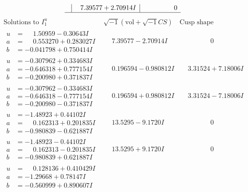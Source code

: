 \documentclass[1p]{elsarticle_modified}
\theoremstyle{definition}
\newcommand{\I}{\sqrt{-1}}
\begin{document}
$$\begin{array}{c|c|c}
 & \phantom{-}7.39577 + 2.70914 I & \phantom{-0.000000 } 0\\
 \hline 
 \end{array}$$\newpage$$\begin{array}{c|c|c}  
\text{Solutions to }I^u_{1}& \I (\text{vol} + \sqrt{-1}CS) & \text{Cusp shape}\\
 \hline 
\begin{aligned}
u &= \phantom{-}1.50959 - 0.30643 I \\
a &= \phantom{-}0.553270 + 0.283027 I \\
b &= -0.041798 + 0.750414 I\end{aligned}
 & \phantom{-}7.39577 - 2.70914 I & \phantom{-0.000000 } 0 \\ \hline\begin{aligned}
u &= -0.307962 + 0.334683 I \\
a &= -0.646318 + 0.777154 I \\
b &= -0.200980 + 0.371837 I\end{aligned}
 & \phantom{-}0.196594 - 0.980812 I & \phantom{-}3.31524 + 7.18006 I \\ \hline\begin{aligned}
u &= -0.307962 - 0.334683 I \\
a &= -0.646318 - 0.777154 I \\
b &= -0.200980 - 0.371837 I\end{aligned}
 & \phantom{-}0.196594 + 0.980812 I & \phantom{-}3.31524 - 7.18006 I \\ \hline\begin{aligned}
u &= -1.48923 + 0.44102 I \\
a &= \phantom{-}0.162313 + 0.201835 I \\
b &= -0.980839 - 0.621887 I\end{aligned}
 & \phantom{-}13.5295 - 9.1720 I & \phantom{-0.000000 } 0 \\ \hline\begin{aligned}
u &= -1.48923 - 0.44102 I \\
a &= \phantom{-}0.162313 - 0.201835 I \\
b &= -0.980839 + 0.621887 I\end{aligned}
 & \phantom{-}13.5295 + 9.1720 I & \phantom{-0.000000 } 0 \\ \hline\begin{aligned}
u &= \phantom{-}0.128136 + 0.410429 I \\
a &= -1.29668 + 0.78147 I \\
b &= -0.560999 + 0.890607 I\end{aligned}

\end{array}$$
\end{document}
